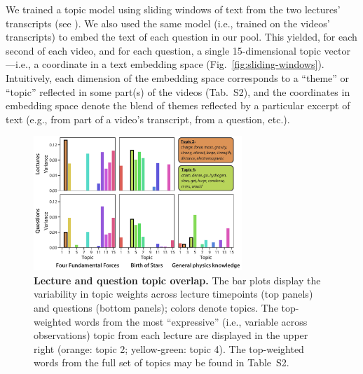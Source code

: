 \documentclass[10pt]{article}
\newcommand{\topics}{S2}
\begin{document}

We trained a topic model \citep{BleiEtal03} using sliding windows of text from the two
lectures' transcripts (see \textit{}). We also used the same model (i.e., trained on the
videos' transcripts) to embed the text of each question in our pool. This
yielded, for each second of each video, and for each question, a single
15-dimensional topic vector---i.e., a coordinate in a text embedding space
(Fig.~\ref{fig:sliding-windows}). Intuitively, each dimension of the embedding
space corresponds to a ``theme'' or ``topic'' reflected in some part(s) of the
videos (Tab.~\topics), and the coordinates in embedding space denote the blend
of themes reflected by a particular excerpt of text (e.g., from part of a
video's transcript, from a question, etc.).

\begin{figure}[tp]
    \centering
    \includegraphics[width=0.7\textwidth]{figs/active-topics}

\caption{\textbf{Lecture and question topic overlap.} The bar plots display the
variability in topic weights across lecture timepoints (top panels) and
questions (bottom panels); colors denote topics. The top-weighted words from
the most ``expressive'' (i.e., variable across observations) topic from each
lecture are displayed in the upper right (orange: topic 2; yellow-green: topic
4). The top-weighted words from the full set of topics may be found in
Table~\topics.}

    \label{fig:topics}
\end{figure}
\end{document}
